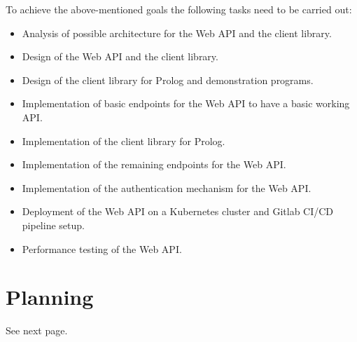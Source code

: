 \documentclass[en]{customTemplate}
\begin{document}
To achieve the above-mentioned goals the following tasks need to be carried out:

\begin{itemize}
    \item Analysis of possible architecture for the Web API and the client library.
    \item Design of the Web API and the client library.
    \item Design of the client library for Prolog and demonstration programs. 
    \item Implementation of basic endpoints for the Web API to have a basic working API.
    \item Implementation of the client library for Prolog.
    \item Implementation of the remaining endpoints for the Web API.
    \item Implementation of the authentication mechanism for the Web API.
    \item Deployment of the Web API on a Kubernetes cluster and Gitlab CI/CD pipeline setup.
    \item Performance testing of the Web API.
\end{itemize}

\section{Planning}   

See next page.

\fancyhf{}
\renewcommand{\headrulewidth}{0pt}

\begin{sidewaysfigure}
\end{sidewaysfigure}

\printglossary[type=\acronymtype]
\printglossary
\printbibliography{}
\end{document}
